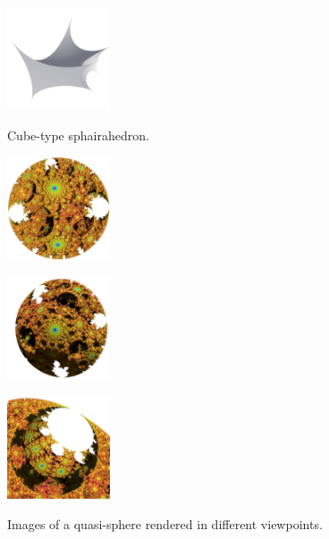 \documentclass[suppldata, dvipdfmx]{interact}
\theoremstyle{plain}%
\theoremstyle{definition}
\theoremstyle{remark}
\theoremstyle{problemstyle}
\begin{document}
\begin{figure}[h!tbp]
  \begin{minipage}[t]{0.25\textwidth}
   \centering
   \includegraphics[height=1.2in, keepaspectratio]{./img/introduction/cube.jpg}
   \caption{Cube-type sphairahedron.}
   \label{fig:cubeSphaira}
  \end{minipage}
  \hspace*{\fill}
 \begin{minipage}[t]{0.75\textwidth}
  \begin{minipage}[t]{0.25\textwidth}
   \centering
   \includegraphics[height=1.2in,
   keepaspectratio]{./img/introduction/quasi-sphere1.jpg}
   \subcaption{}
   \label{fig:quasi-sphere1}
  \end{minipage}
  \hspace*{\fill}
  \begin{minipage}[t]{0.25\textwidth}
   \centering
   \includegraphics[height=1.2in,
   keepaspectratio]{./img/introduction/quasi-sphere2.jpg}
   \subcaption{}
   \label{fig:quasi-sphere2}
  \end{minipage}
  \hspace*{\fill}
  \begin{minipage}[t]{0.25\textwidth}
   \centering
   \includegraphics[height=1.2in,
   keepaspectratio]{./img/introduction/quasi-sphere-zoom.jpg}
   \subcaption{}
   \label{fig:quasi-sphereZoom}
  \end{minipage}
  \hspace*{\fill}
  \caption{Images of a quasi-sphere rendered in different viewpoints.}
  \label{fig:quasi-sphere}
 \end{minipage}
\end{figure}
\end{document}

